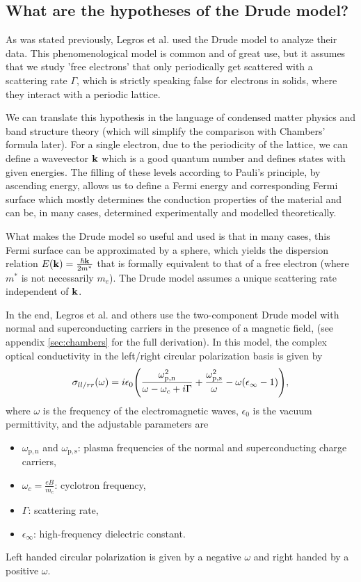 \subsection{What are the hypotheses of the Drude model?}
As was stated previously, Legros et al.\cite{legros2022} used the Drude model to analyze their data. 
This phenomenological model is common and of great use, but it assumes that we study 'free electrons' that only periodically get scattered with a scattering rate $\Gamma$, 
which is strictly speaking false for electrons in solids, 
where they interact with a periodic lattice.

We can translate this hypothesis in the language of condensed matter physics and band structure theory (which will simplify the comparison with Chambers' formula later). 
For a single electron, due to the periodicity of the lattice, 
we can define a wavevector $\vb{k}$ which is a good quantum number and defines states with given energies. 
The filling of these levels according to Pauli's principle, by ascending energy, 
allows us to define a Fermi energy and corresponding Fermi surface 
which mostly determines the conduction properties of the material and can be, 
in many cases, determined experimentally and modelled theoretically.

What makes the Drude model so useful and used is that in many cases, 
this Fermi surface can be approximated by a sphere, which yields the dispersion relation
$E(\vb{k}) = \frac{\hbar\vb{k}}{2m^*}$  that is formally equivalent to that of a free electron
(where $m^*$ is not necessarily $m_e$). The Drude model assumes a unique scattering rate
independent of $\vb{k}$.

In the end, Legros et al.\cite{legros2022} and others\cite{post2021} use the two-component Drude model with normal and superconducting carriers in the presence of a magnetic field, (see appendix \ref{sec:chambers} for the full derivation).
In this model, the complex optical conductivity in the left/right circular polarization basis is given by
\begin{equation}
    \sigma_{ll/rr}(\omega) = i\epsilon_0\qty(
        \frac{\omega^2_{\mathrm{p,n}}}{\omega-\omega_c+i\Gamma}
        + \frac{\omega^2_{\mathrm{p,s}}}{\omega} - \omega(\epsilon_{\infty} - 1)),
\end{equation}
where $\omega$ is the frequency of the electromagnetic waves, $\epsilon_0$ is the vacuum
permittivity, and the adjustable parameters are
\begin{itemize}
    \item $\omega_{\mathrm{p,n}}$ and $\omega_{\mathrm{p,s}}$: plasma frequencies of the normal and
        superconducting charge carriers,
    \item $\omega_c = \frac{eB}{m_c}$: cyclotron frequency,
    \item $\Gamma$: scattering rate,
    \item $\epsilon_{\infty}$: high-frequency dielectric constant.
\end{itemize}
Left handed circular polarization is given by a negative $\omega$ and right handed by a positive $\omega$.

